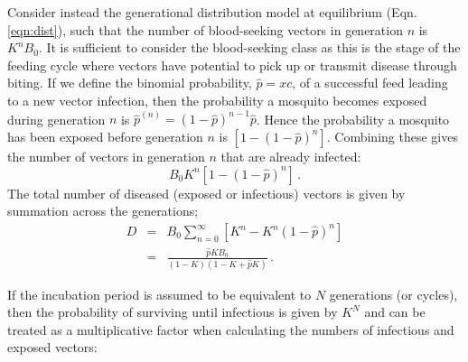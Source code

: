 
Consider instead the generational distribution model at equilibrium (Eqn. \ref{eqn:dist}), such that the number of blood-seeking vectors in generation $n$ is $K^nB_0$. It is sufficient to consider the blood-seeking class as this is the stage of the feeding cycle where vectors have potential to pick up or transmit disease through biting. If we define the binomial probability, $\hat{p}=xc$, of a successful feed leading to a new vector infection, then the probability a mosquito becomes exposed during generation $n$ is $\hat{p}^{(n)}=(1-\hat{p})^{n-1}\hat{p}$. Hence the probability a mosquito has been exposed before generation $n$ is $[1-(1-\hat{p})^n]$. Combining these gives the number of vectors in generation $n$ that are already infected:
\begin{equation}
B_0K^n[1-(1-\hat{p})^n]\,.
\label{eqn:probinfect}
\end{equation}
The total number of diseased (exposed or infectious) vectors is given by summation across the generations;
\begin{eqnarray}
D &=& B_0\sum_{n=0}^{\infty} [K^n - K^n(1-\hat{p})^n]\\
&=& \frac{\hat{p}KB_0}{(1-K)(1-K+\hat{p}K)}\,.
\end{eqnarray}

If the incubation period is assumed to be equivalent to $N$ generations (or cycles), then the probability of surviving until infectious is given by $K^N$ and can be treated as a multiplicative factor when calculating the numbers of infectious and exposed vectors:

